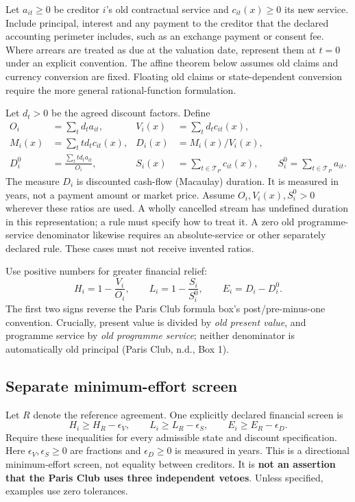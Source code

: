 \documentclass[11pt,a4paper]{article}
\begin{document}
Let $a_{it}\geq0$ be creditor $i$'s old contractual service and $c_{it}(x)\geq0$ its new service. Include principal, interest and any payment to the creditor that the declared accounting perimeter includes, such as an exchange payment or consent fee. Where arrears are treated as due at the valuation date, represent them at $t=0$ under an explicit convention. The affine theorem below assumes old claims and currency conversion are fixed. Floating old claims or state-dependent conversion require the more general rational-function formulation.

Let $d_t>0$ be the agreed discount factors. Define
\begin{align}
 O_i&=\sum_t d_t a_{it}, &V_i(x)&=\sum_t d_t c_{it}(x),\\
 M_i(x)&=\sum_t t d_t c_{it}(x), &D_i(x)&=M_i(x)/V_i(x),\\
 D_i^0&=\frac{\sum_t t d_t a_{it}}{O_i}, &
 S_i(x)&=\sum_{t\in\mathcal T_P}c_{it}(x),\qquad S_i^0=\sum_{t\in\mathcal T_P}a_{it}.
\end{align}
The measure $D_i$ is discounted cash-flow (Macaulay) duration. It is measured in years, not a payment amount or market price. Assume $O_i,V_i(x),S_i^0>0$ wherever these ratios are used. A wholly cancelled stream has undefined duration in this representation; a rule must specify how to treat it. A zero old programme-service denominator likewise requires an absolute-service or other separately declared rule. These cases must not receive invented ratios.

Use positive numbers for greater financial relief:
\begin{equation}\label{eq:metrics}
 H_i=1-\frac{V_i}{O_i},\qquad L_i=1-\frac{S_i}{S_i^0},\qquad E_i=D_i-D_i^0.
\end{equation}
The first two signs reverse the Paris Club formula box's post/pre-minus-one convention. Crucially, present value is divided by \emph{old present value}, and programme service by \emph{old programme service}; neither denominator is automatically old principal (Paris Club, n.d., Box 1).

\subsection{Separate minimum-effort screen}
Let $R$ denote the reference agreement. One explicitly declared financial screen is
\begin{equation}\label{eq:strict}
 H_i\geq H_R-\epsilon_V,\qquad L_i\geq L_R-\epsilon_S,\qquad
 E_i\geq E_R-\epsilon_D.
\end{equation}
Require these inequalities for every admissible state and discount specification.
Here $\epsilon_V,\epsilon_S\geq0$ are fractions and $\epsilon_D\geq0$ is measured in years. This is a directional minimum-effort screen, not equality between creditors. It is \textbf{not an assertion that the Paris Club uses three independent vetoes}. Unless specified, examples use zero tolerances.
\end{document}
